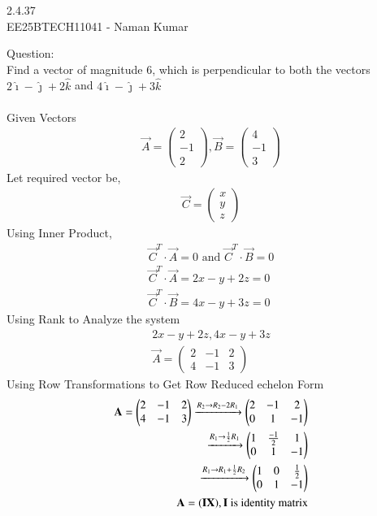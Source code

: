 \documentclass[journal]{IEEEtran}
\author{EE25BTECH11041-Naman Kumar }
\begin{document}
\begin{center}
    \huge{2.4.37}\\
    \large{EE25BTECH11041 - Naman Kumar}
\end{center}
Question:\\
Find a vector of magnitude 6, which is perpendicular to both the vectors $2\hat{\imath} - \hat{\jmath} + 2\hat{k}$ and $4\hat{\imath} - \hat{\jmath} + 3\hat{k}$\\
\solution \\
Given Vectors
\begin{align}
    \Vec{A}=\begin{pmatrix} 2\\-1\\2 \end{pmatrix}, \Vec{B}=\begin{pmatrix} 4\\-1\\3 \end{pmatrix}
\end{align}
Let required vector be,
\begin{align}
    \vec{C}=\begin{pmatrix} x\\y\\z \end{pmatrix}
\end{align}
Using Inner Product,
\begin{align}
    \vec{C}^T \cdot\vec{A}=0\text{ and }\vec{C}^T \cdot\vec{B}=0\\
    \vec{C}^T \cdot\vec{A}=2x-y+2z=0 \label{1} \\
    \vec{C}^T \cdot\vec{B}=4x-y+3z=0 \label{2}
\end{align}
Using Rank to Analyze the system
\begin{align}
    2x-y+2z,4x-y+3z\\
    \vec{A}=\begin{pmatrix} 2&-1&2\\4&-1&3 \end{pmatrix}
\end{align}
Using Row Transformations to Get Row Reduced echelon Form
\begin{align}
    \vec{A}=\begin{pmatrix} 2&-1&2\\4&-1&3 \end{pmatrix} \xrightarrow[]{R_2 \rightarrow R_2-2R_1}\begin{pmatrix} 2&-1&2\\0&1&-1 \end{pmatrix}\\
    \xrightarrow[]{R_1 \rightarrow \frac{1}{2}R_1}\begin{pmatrix} 1&\frac{-1}{2}&1\\0&1&-1 \end{pmatrix}\\
    \xrightarrow[]{R_1 \rightarrow R_1+\frac{1}{2}R_2}\begin{pmatrix} 1&0&\frac{1}{2}\\0&1&-1 \end{pmatrix}\\
    \vec{A}=(\vec{I}\vec{X}), \text{\textbf{I} is identity matrix}
\end{align}
\end{document}
